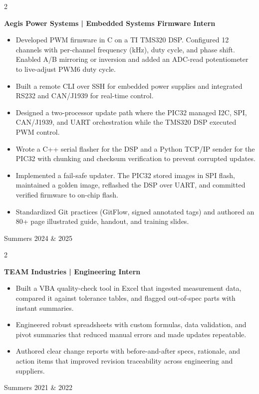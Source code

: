 \documentclass[10pt, letterpaper]{article}
\newenvironment{highlights}{
    \begin{itemize}[
        topsep=0pt,
        parsep=0pt,
        partopsep=0pt,
        itemsep=0pt,
        leftmargin=0.30 cm + 8pt
    ]
}{
    \end{itemize}
}
\newenvironment{twocolentry}[2][]{
    \onecolentry
    \def\secondColumn{#2}
    \setcolumnwidth{\fill, 4.2 cm}
    \begin{paracol}{2}
}{
    \switchcolumn \raggedleft \secondColumn
    \end{paracol}
    \endonecolentry
}
\begin{document}
\begin{twocolentry}{Summers 2024 \& 2025}
    \textbf{Aegis Power Systems \;| \; Embedded Systems Firmware Intern}
    \begin{highlights}
        \item[\textbf{$\vartriangleright$}] Developed PWM firmware in C on a TI TMS320 DSP. Configured 12 channels with per-channel frequency (kHz), duty cycle, and phase shift. Enabled A/B mirroring or inversion and added an ADC-read potentiometer to live-adjust PWM6 duty cycle.
        \item[\textbf{$\vartriangleright$}] Built a remote CLI over SSH for embedded power supplies and integrated RS232 and CAN/J1939 for real-time control.
        \item[\textbf{$\vartriangleright$}] Designed a two-processor update path where the PIC32 managed I2C, SPI, CAN/J1939, and UART orchestration while the TMS320 DSP executed PWM control.
        \item[\textbf{$\vartriangleright$}] Wrote a C++ serial flasher for the DSP and a Python TCP/IP sender for the PIC32 with chunking and checksum verification to prevent corrupted updates.
        \item[\textbf{$\vartriangleright$}] Implemented a fail-safe updater. The PIC32 stored images in SPI flash, maintained a golden image, reflashed the DSP over UART, and committed verified firmware to on-chip flash.
        \item[\textbf{$\vartriangleright$}] Standardized Git practices (GitFlow, signed annotated tags) and authored an 80+ page illustrated guide, handout, and training slides.
    \end{highlights}
\end{twocolentry}
\vspace{5pt}
\begin{twocolentry}{Summers 2021 \& 2022}
    \textbf{TEAM Industries \;| \; Engineering Intern}
    \begin{highlights}
        \item[\textbf{$\vartriangleright$}] Built a VBA quality-check tool in Excel that ingested measurement data, compared it against tolerance tables, and flagged out-of-spec parts with instant summaries.
        \item[\textbf{$\vartriangleright$}] Engineered robust spreadsheets with custom formulas, data validation, and pivot summaries that reduced manual errors and made updates repeatable.
        \item[\textbf{$\vartriangleright$}] Authored clear change reports with before-and-after specs, rationale, and action items that improved revision traceability across engineering and suppliers.
    \end{highlights}
\end{twocolentry}
\end{document}
